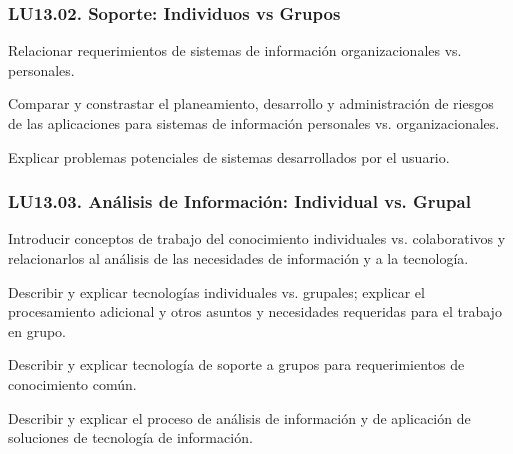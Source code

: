 \subsubsection{LU13.02. Soporte: Individuos vs Grupos}\label{sec:LU13.02}
\begin{LearningUnit}
\begin{LUGoal}
\item Relacionar requerimientos de sistemas de información organizacionales vs. personales.
\end{LUGoal}

\begin{LUObjective}
\item Comparar y constrastar el planeamiento, desarrollo y administración de riesgos de las aplicaciones para sistemas de información personales vs. organizacionales.
\item Explicar problemas potenciales de sistemas desarrollados por el usuario.
\end{LUObjective}
\end{LearningUnit}

\subsubsection{LU13.03. Análisis de Información: Individual vs. Grupal}\label{sec:LU13.03}
\begin{LearningUnit}
\begin{LUGoal}
\item Introducir conceptos de trabajo del conocimiento individuales vs. colaborativos y relacionarlos al análisis de las necesidades de información y a la tecnología.
\end{LUGoal}

\begin{LUObjective}
\item Describir y explicar tecnologías individuales vs. grupales; explicar el procesamiento adicional y otros asuntos y necesidades requeridas para el trabajo en grupo.
\item Describir y explicar tecnología de soporte a grupos para requerimientos de conocimiento común.
\item Describir y explicar el proceso de análisis de información y de aplicación de soluciones de tecnología de información.
\end{LUObjective}
\end{LearningUnit}

